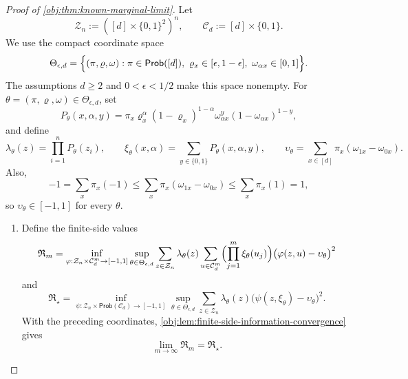 \begin{proof}[Proof of \cref{obj:thm:known-marginal-limit}]
Let
\[
\mathcal Z_n:=([d]\times\{0,1\}^2)^n,
\qquad
\mathcal C_d:=[d]\times\{0,1\}.
\]
We use the compact coordinate space
\[
\Theta_{\epsilon,d}
=
\Bigl\{(\pi,\varrho,\omega):
\pi\in\mathsf{Prob}([d]),\
\varrho_x\in[\epsilon,1-\epsilon],\
\omega_{\alpha x}\in[0,1]\Bigr\}.
\]
The assumptions \(d\ge2\) and \(0<\epsilon<1/2\) make this space nonempty.  For
\(\theta=(\pi,\varrho,\omega)\in\Theta_{\epsilon,d}\), set
\[
P_\theta(x,\alpha,y)
=
\pi_x\varrho_x^\alpha(1-\varrho_x)^{1-\alpha}
\omega_{\alpha x}^y(1-\omega_{\alpha x})^{1-y},
\]
and define
\[
\lambda_\theta(z)
=
\prod_{i=1}^n P_\theta(z_i),
\qquad
\xi_\theta(x,\alpha)
=
\sum_{y\in\{0,1\}}P_\theta(x,\alpha,y),
\qquad
\upsilon_\theta
=
\sum_{x\in[d]}\pi_x(\omega_{1x}-\omega_{0x}).
\]
Also,
\[
-1
=
\sum_x\pi_x(-1)
\le
\sum_x\pi_x(\omega_{1x}-\omega_{0x})
\le
\sum_x\pi_x(1)
=
1,
\]
so \(\upsilon_\theta\in[-1,1]\) for every \(\theta\). %

\begin{enumerate}
\item\label{pf:known-marginal-limit:finite-side} Define the finite-side values
\[
\mathfrak R_m
=
\inf_{\varphi:\mathcal Z_n\times\mathcal C_d^m\to[-1,1]}
\sup_{\theta\in\Theta_{\epsilon,d}}
\sum_{z\in\mathcal Z_n}\lambda_\theta(z)
\sum_{u\in\mathcal C_d^m}
\Bigl(\prod_{j=1}^m\xi_\theta(u_j)\Bigr)
\bigl(\varphi(z,u)-\upsilon_\theta\bigr)^2
\]
and
\[
\mathfrak R_\star
=
\inf_{\psi:\mathcal Z_n\times\mathsf{Prob}(\mathcal C_d)\to[-1,1]}
\sup_{\theta\in\Theta_{\epsilon,d}}
\sum_{z\in\mathcal Z_n}\lambda_\theta(z)
\bigl(\psi(z,\xi_\theta)-\upsilon_\theta\bigr)^2 .
\]
With the preceding coordinates, \cref{obj:lem:finite-side-information-convergence} gives
\[
\lim_{m\to\infty}\mathfrak R_m=\mathfrak R_\star .
\]


\end{enumerate}
\end{proof}
